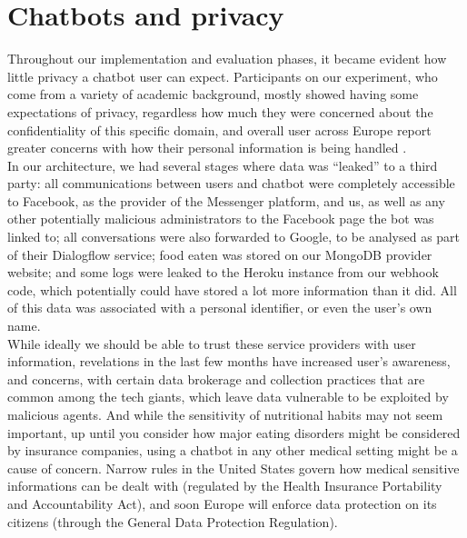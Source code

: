 \section{Chatbots and privacy}
Throughout our implementation and evaluation phases, it became evident how little privacy a chatbot user can expect. Participants on our experiment, who come from a variety of academic background, mostly showed having some expectations of privacy, regardless how much they were concerned about the confidentiality of this specific domain, and overall user across Europe report greater concerns with how their personal information is being handled \cite{europasurvey}. \\
In our architecture, we had several stages where data was ``leaked'' to a third party: all communications between users and chatbot were completely accessible to Facebook, as the provider of the Messenger platform, and us, as well as any other potentially malicious administrators to the Facebook page the bot was linked to; all conversations were also forwarded to Google, to be analysed as part of their Dialogflow service; food eaten was stored on our MongoDB provider website; and some logs were leaked to the Heroku instance from our webhook code, which potentially could have stored a lot more information than it did. All of this data was associated with a personal identifier, or even the user's own name. \\
While ideally we should be able to trust these service providers with user information, revelations in the last few months have increased user's awareness, and concerns, with certain data brokerage and collection practices that are common among the tech giants, which leave data vulnerable to be exploited by malicious agents. And while the sensitivity of nutritional habits may not seem important, up until you consider how major eating disorders might be considered by insurance companies, using a chatbot in any other medical setting might be a cause of concern. Narrow rules in the United States govern how medical sensitive informations can be dealt with (regulated by the Health Insurance Portability and Accountability Act), and soon Europe will enforce data protection on its citizens (through the General Data Protection Regulation). \\
